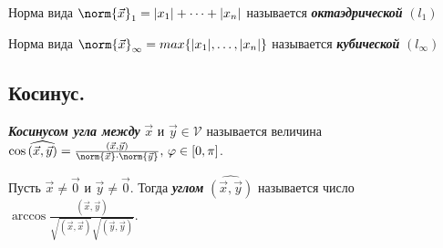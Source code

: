 \begin{definition}
    Норма вида $\norm{\vec{x}}_1 = |x_1| + \dots + |x_n|$ называется \textbf{\textit{октаэдрической}} $(l_1)$
\end{definition}

\begin{definition}
    Норма вида $\norm{\vec{x}}_{\infty} = max\{|x_1|, \dots, |x_n|\}$ называется \textbf{\textit{кубической}} $(l_{\infty})$
\end{definition}


\newpage


\subsection{
    Косинус.
}

\begin{definition}
    \textbf{\textit{Косинусом угла между}} $\vec{x}$ и $\vec{y} \in \mathcal{V}$ называется величина $\cos \widehat{(\vec{x}, \vec{y})} = \frac{(\vec{x}, \vec{y})}{\norm{\vec{x}} \cdot\norm{\vec{y}}}, \thinspace \varphi \in [0, \pi]$.
\end{definition}

\begin{definition}
    Пусть $\vec{x} \ne \vec{0}$ и $\vec{y} \ne \vec{0}$. Тогда \textbf{\textit{углом}} $\widehat{(\vec{x}, \vec{y})}$ называется число $\arccos{\frac{(\vec{x}, \vec{y})}{\sqrt{(\vec{x}, \vec{x})} \sqrt{(\vec{y}, \vec{y})}}}$.
\end{definition}
